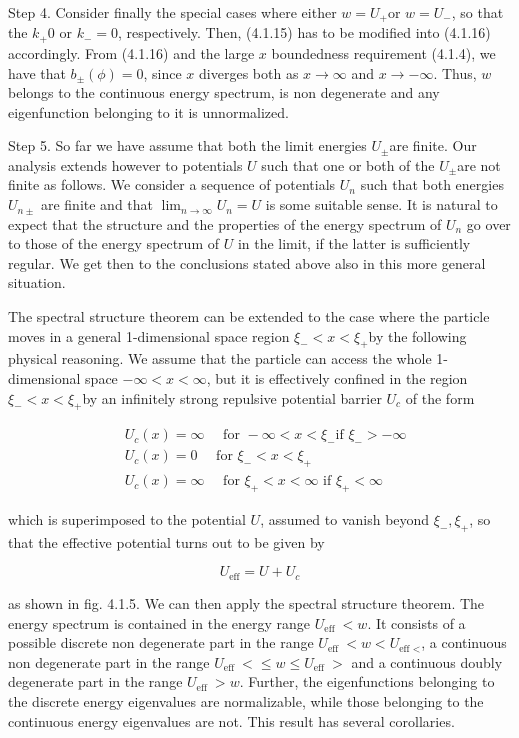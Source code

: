\documentclass{article}
\begin{document}
Step 4. Consider finally the special cases where either $w=U_{+}$or $w=U_{-}$, so that the $k_{+} 0$ or $k_{-}=0$, respectively. Then, (4.1.15) has to be modified into (4.1.16) accordingly. From (4.1.16) and the large $x$ boundedness requirement (4.1.4), we have that $b_{ \pm}(\phi)=0$, since $x$ diverges both as $x \rightarrow \infty$ and $x \rightarrow-\infty$. Thus, $w$ belongs to the continuous energy spectrum, is non degenerate and any eigenfunction belonging to it is unnormalized.

Step 5. So far we have assume that both the limit energies $U_{ \pm}$are finite. Our analysis extends however to potentials $U$ such that one or both of the $U_{ \pm}$are not finite
as follows. We consider a sequence of potentials $U_{n}$ such that both energies $U_{n \pm}$ are finite and that $\lim _{n \rightarrow \infty} U_{n}=U$ is some suitable sense. It is natural to expect that the structure and the properties of the energy spectrum of $U_{n}$ go over to those of the energy spectrum of $U$ in the limit, if the latter is sufficiently regular. We get then to the conclusions stated above also in this more general situation.

The spectral structure theorem can be extended to the case where the particle moves in a general 1-dimensional space region $\xi_{-}<x<\xi_{+}$by the following physical reasoning. We assume that the particle can access the whole 1-dimensional space $-\infty<x<\infty$, but it is effectively confined in the region $\xi_{-}<x<\xi_{+}$by an infinitely strong repulsive potential barrier $U_{c}$ of the form
 
\begin{align*}
& U_{c}(x)=\infty \quad \text { for }-\infty<x<\xi_{-} \text {if } \xi_{-}>-\infty  \tag{4.1.30a}\\
& U_{c}(x)=0 \quad \text { for } \xi_{-}<x<\xi_{+}  \tag{4.1.30b}\\
& U_{c}(x)=\infty \quad \text { for } \xi_{+}<x<\infty \text { if } \xi_{+}<\infty \tag{4.1.30c}
\end{align*}
 
which is superimposed to the potential $U$, assumed to vanish beyond $\xi_{-}, \xi_{+}$, so that the effective potential turns out to be given by
 
\begin{equation*}
U_{\mathrm{eff}}=U+U_{c} \tag{4.1.31}
\end{equation*}
 
as shown in fig. 4.1.5. We can then apply the spectral structure theorem. The energy spectrum is contained in the energy range $U_{\text {eff }}<w$. It consists of a possible discrete non degenerate part in the range $U_{\text {eff }}<w<U_{\text {eff }<}$, a continuous non degenerate part in the range $U_{\text {eff }}<\leq w \leq U_{\text {eff }}>$ and a continuous doubly degenerate part in the range $U_{\text {eff }}>w$. Further, the eigenfunctions belonging to the discrete energy eigenvalues are normalizable, while those belonging to the continuous energy eigenvalues are not. This result has several corollaries.
\end{document}
